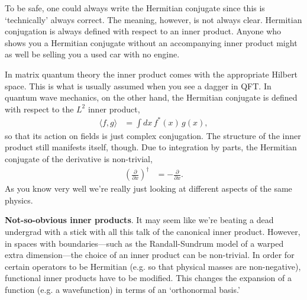 \documentclass[12pt]{article}
\numberwithin{equation}{section}    %
\begin{document}
To be safe, one could always write the Hermitian conjugate since this is `technically' always correct. The meaning, however, is not always clear. Hermitian conjugation is always defined with respect to an inner product. Anyone who shows you a Hermitian conjugate without an accompanying inner product might as well be selling you a used car with no engine. 

In matrix quantum theory the inner product comes with the appropriate Hilbert space. This is what is usually assumed when you see a dagger in QFT. In quantum wave mechanics, on the other hand, the Hermitian conjugate is defined with respect to the $L^2$ inner product,
\begin{align}
	\langle f,g \rangle &= \int dx\, f^*(x)\,g(x),
\end{align}
so that its action on fields is just complex conjugation. The structure of the inner product still manifests itself, though. Due to integration by parts, the Hermitian conjugate of the derivative is non-trivial,
\begin{align}
	\left(\frac{\partial}{\partial x}\right)^\dag &= -\frac{\partial}{\partial x}.
\end{align}
As you know very well we're really just looking at different aspects of the same physics.

\vspace{.5em}
\begin{framed}
\noindent\textbf{Not-so-obvious inner products}. It may seem like we're beating a dead undergrad with a stick with all this talk of the canonical inner product. However, in spaces with boundaries---such as the Randall-Sundrum model of a warped extra dimension---the choice of an inner product can be non-trivial. In order for certain operators to be Hermitian (e.g. so that physical masses are non-negative),  functional inner products have to be modified. This changes the expansion of a function (e.g. a wavefunction) in terms of an `orthonormal basis.'
\end{framed} 
\vspace{.5em}
\end{document}
